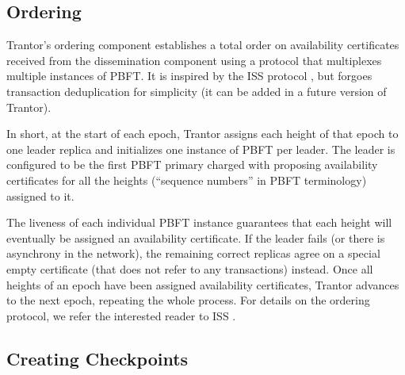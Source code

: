\documentclass{article}
\begin{document}
\subsection{Ordering}

Trantor’s ordering component establishes a total order on availability certificates
received from the dissemination component using a protocol that multiplexes multiple instances of PBFT.
It is inspired by the ISS protocol \cite{iss}, but forgoes transaction deduplication for simplicity
(it can be added in a future version of Trantor).

In short, at the start of each epoch, Trantor assigns each height of that epoch to one leader replica
and initializes one instance of PBFT per leader.
The leader is configured to be the first PBFT primary charged with proposing availability certificates
for all the heights (“sequence numbers” in PBFT terminology) assigned to it.

The liveness of each individual PBFT instance guarantees
that each height will eventually be assigned an availability certificate.
If the leader fails (or there is asynchrony in the network),
the remaining correct replicas agree on a special empty certificate (that does not refer to any transactions) instead. Once all heights of an epoch have been assigned availability certificates,
Trantor advances to the next epoch, repeating the whole process.
For details on the ordering protocol, we refer the interested reader to ISS \cite{iss}.

\subsection{Creating Checkpoints}
\label{sec:creating-checkpoints}
\end{document}

